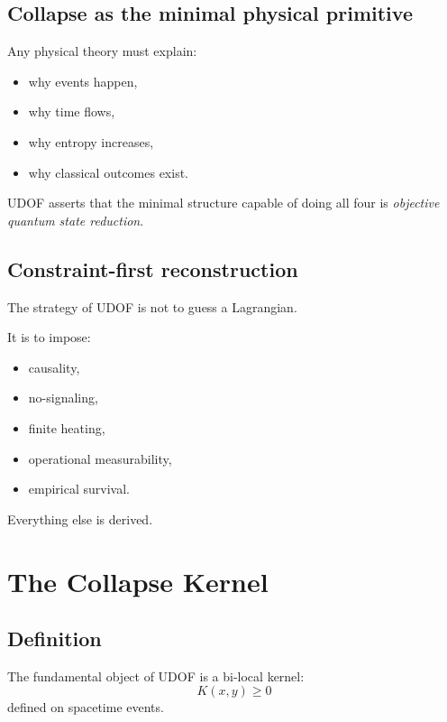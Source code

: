 \documentclass[11pt]{book}
\begin{document}
\section{Collapse as the minimal physical primitive}

Any physical theory must explain:

\begin{itemize}
\item why events happen,
\item why time flows,
\item why entropy increases,
\item why classical outcomes exist.
\end{itemize}

UDOF asserts that the minimal structure capable of doing all four is
\emph{objective quantum state reduction}.

\section{Constraint-first reconstruction}

The strategy of UDOF is not to guess a Lagrangian.

It is to impose:
\begin{itemize}
\item causality,
\item no-signaling,
\item finite heating,
\item operational measurability,
\item empirical survival.
\end{itemize}

Everything else is derived.

\chapter{The Collapse Kernel}

\section{Definition}

The fundamental object of UDOF is a bi-local kernel:
\begin{equation}
K(x,y) \ge 0
\end{equation}
defined on spacetime events.
\end{document}
